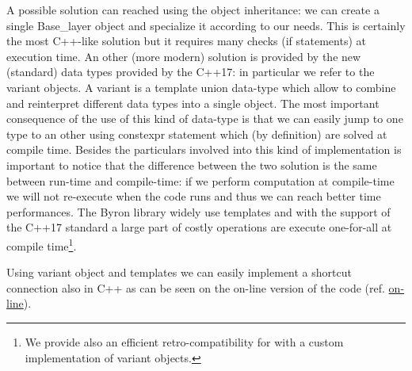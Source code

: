 \documentclass{standalone}
\begin{document}
A possible solution can reached using the object inheritance: we can create a single \textsf{Base\_layer} object and specialize it according to our needs.
This is certainly the most \textsf{C++}-like solution but it requires many checks (if statements) at execution time.
An other (more modern) solution is provided by the new (standard) data types provided by the \textsf{C++17}: in particular we refer to the \textsf{variant} objects.
A \textsf{variant} is a \textsf{template union} data-type which allow to combine and reinterpret different data types into a single object.
The most important consequence of the use of this kind of data-type is that we can easily jump to one type to an other using \textsf{constexpr} statement which (by definition) are solved at compile time.
Besides the particulars involved into this kind of implementation is important to notice that the difference between the two solution is the same between run-time and compile-time: if we perform computation at compile-time we will not re-execute when the code runs and thus we can reach better time performances.
The \textsf{Byron} library widely use \textsf{template}s and with the support of the \textsf{C++17} standard a large part of costly operations are execute one-for-all at compile time\footnote{
  We provide also an efficient retro-compatibility for  with a custom implementation of \textsf{variant} objects.
}.

Using \textsf{variant} object and \textsf{templates} we can easily implement a shortcut connection also in \textsf{C++} as can be seen on the on-line version of the code (ref. \href{https://github.com/Nico-Curti/Byron/blob/master/src/shortcut_layer.cpp}{on-line}).
\end{document}
